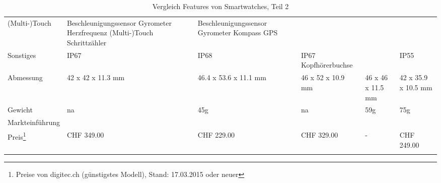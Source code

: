 \begin{landscape}
\begin{longtable}{p{2.8cm}p{3.5cm}p{3.5cm}p{3.5cm}p{3.5cm}p{3.5cm}}
			(Multi-)Touch
		& Beschleunigungssensor \newline
			Gyrometer \newline
			Herzfrequenz \newline
			(Multi-)Touch \newline
			Schrittzähler 
		& Beschleunigungssensor \newline
			Gyrometer \newline
			Kompass \newline
			GPS\\
	Sonstiges
		& IP67
		& IP68
		& IP67 \newline
			Kopfhörerbuchse
		&
		& IP55\\
	Abmessung
	    & 42 x 42 x 11.3 mm
		& 46.4 x 53.6 x 11.1 mm
		& 46 x 52 x 10.9 mm
		& 46 x 46 x 11.5 mm
		& 42 x 35.9 x 10.5 mm\\
	Gewicht
		& na
		& 45g
		& na
		& 59g
		& 75g\\ 
	Markteinführung
		\\
	Preis\footnote{Preise von digitec.ch (günstigstes Modell), Stand: 17.03.2015 oder neuer}
		& CHF 349.00	
		& CHF 229.00
		& CHF 329.00
		& -
		& CHF 249.00\\
	\hline
	\caption{Vergleich Features von Smartwatches, Teil 2} \\
	
\end{longtable}
\end{landscape}